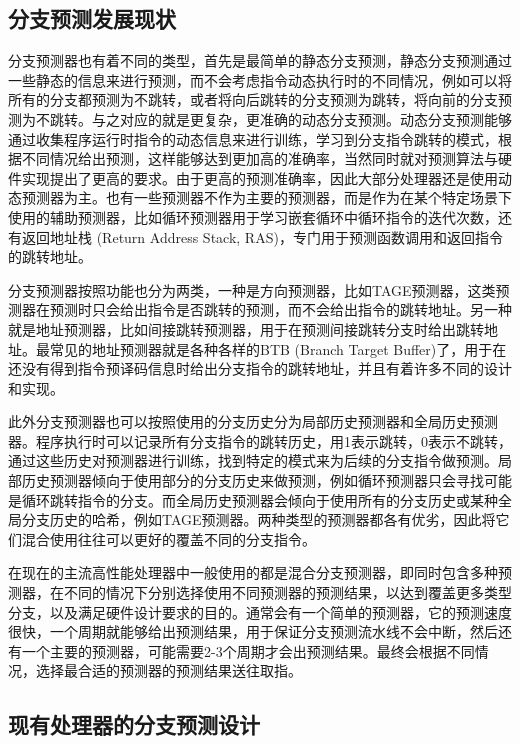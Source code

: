 \subsection{分支预测发展现状}

分支预测器也有着不同的类型，首先是最简单的静态分支预测，静态分支预测通过一些静态的信息来进行预测，而不会考虑指令动态执行时的不同情况，例如可以将所有的分支都预测为不跳转，或者将向后跳转的分支预测为跳转，将向前的分支预测为不跳转。与之对应的就是更复杂，更准确的动态分支预测。动态分支预测能够通过收集程序运行时指令的动态信息来进行训练，学习到分支指令跳转的模式，根据不同情况给出预测，这样能够达到更加高的准确率，当然同时就对预测算法与硬件实现提出了更高的要求。由于更高的预测准确率，因此大部分处理器还是使用动态预测器为主。也有一些预测器不作为主要的预测器，而是作为在某个特定场景下使用的辅助预测器，比如循环预测器用于学习嵌套循环中循环指令的迭代次数，还有返回地址栈 (Return Address Stack, RAS)，专门用于预测函数调用和返回指令的跳转地址。

分支预测器按照功能也分为两类，一种是方向预测器，比如TAGE预测器，这类预测器在预测时只会给出指令是否跳转的预测，而不会给出指令的跳转地址。另一种就是地址预测器，比如间接跳转预测器，用于在预测间接跳转分支时给出跳转地址。最常见的地址预测器就是各种各样的BTB (Branch Target Buffer)了，用于在还没有得到指令预译码信息时给出分支指令的跳转地址，并且有着许多不同的设计和实现。

此外分支预测器也可以按照使用的分支历史分为局部历史预测器和全局历史预测器。程序执行时可以记录所有分支指令的跳转历史，用1表示跳转，0表示不跳转，通过这些历史对预测器进行训练，找到特定的模式来为后续的分支指令做预测。局部历史预测器倾向于使用部分的分支历史来做预测，例如循环预测器只会寻找可能是循环跳转指令的分支。而全局历史预测器会倾向于使用所有的分支历史或某种全局分支历史的哈希，例如TAGE预测器。两种类型的预测器都各有优劣，因此将它们混合使用往往可以更好的覆盖不同的分支指令。

在现在的主流高性能处理器中一般使用的都是混合分支预测器，即同时包含多种预测器，在不同的情况下分别选择使用不同预测器的预测结果，以达到覆盖更多类型分支，以及满足硬件设计要求的目的。通常会有一个简单的预测器，它的预测速度很快，一个周期就能够给出预测结果，用于保证分支预测流水线不会中断，然后还有一个主要的预测器，可能需要2-3个周期才会出预测结果。最终会根据不同情况，选择最合适的预测器的预测结果送往取指。

\subsection{现有处理器的分支预测设计}

